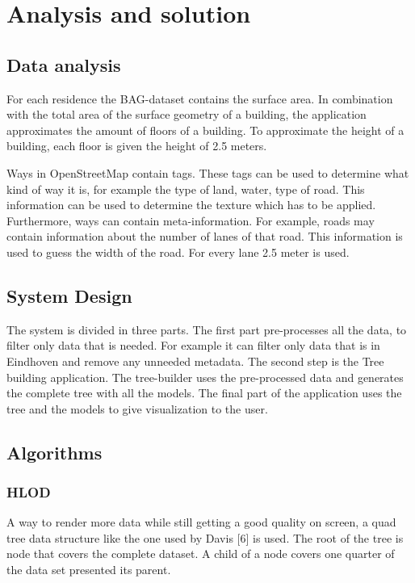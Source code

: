 \chapter{Analysis and solution}
\label{chap:AnalysisAndSolution}
\section{Data analysis}
\label{sec:DataAnalysis}
For each residence the BAG-dataset contains the surface area. In combination with the total area of the surface geometry of a building, the application approximates the amount of floors of a building. To approximate the height of a building, each floor is given the height of 2.5 meters.

Ways in OpenStreetMap contain tags. These tags can be used to determine what kind of way it is, for example the type of land, water, type of road. This information can be used to determine the texture which has to be applied. Furthermore, ways can contain meta-information.  For example, roads may contain information about the number of lanes of that road. This information is used to guess the width of the road. For every lane 2.5 meter is used.

\section{System Design}
\label{sec:SystemDesign}
The system is divided in three parts. The first part pre-processes all the data, to filter only data that is needed. For example it can filter only data that is in Eindhoven and remove any unneeded metadata. The second step is the Tree building application. The tree-builder uses the pre-processed data and generates the complete tree with all the models. The final part of the application uses the tree and the models to give visualization to the user.

\section{Algorithms}
\label{sec:Algorithms}
\subsection{HLOD}
\label{subsec:HLOD}
A way to render more data while still getting a good quality on screen, a quad tree data structure like the one used by Davis [6] is used. The root of the tree is node that covers the complete dataset. A child of a node covers one quarter of the data set presented its parent.

